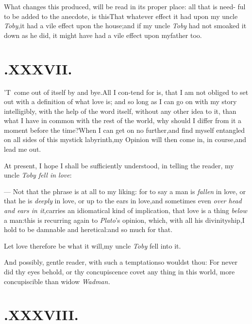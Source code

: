 \documentclass{article}
\begin{document}
What changes this produced, will be read in its proper place:
all that is need- ful to be added to the anecdote, is
this\break\tsh That whatever effect it had upon my uncle
\textit{Toby},\tsh it had a vile effect upon the
house;\tsh and if my uncle \textit{Toby} had not smoaked it
down as he did, it might have had a vile effect upon my\break father
too.

\medskip

\section{.\enspace XXXVII.}

\lettrine{\Tsk ’T}{\,} come out of itself\break
by and bye.\tsk All I con-\break tend for is, that I am
not obliged to set out with a definition of what love is; and so
long as I can go on with my story intelligibly, with the help of
the word itself, without any other idea to it, than what I have in
common with the rest of the world, why should I differ from it
a moment before the time?\tsh When I
can get
on no further,\tsk and find myself entangled on all sides of this
mystick labyrinth,\tsk my Opinion will then come in, in
course,\tsk and lead me out.

At present, I hope I shall be sufficiently understood, in
telling the reader, my uncle \textit{Toby fell in love}:

— Not that the phrase is at all to my liking: for to say a
man is \textit{fallen} in love,\break
\tsk or that he is \textit{deeply} in love,
\tsk or up to the ears in love,\tsk and sometimes even
\textit{over head and ears in it},\tsk carries an idiomatical kind
of implication, that love is a thing \textit{below} a man:\tsk this
is recurring again to \textit{Plato}’s opinion, which, with all
his divinityship,\tsk I hold to be damnable and
heretical:\tsk and so much for that.

Let love therefore be what it will,\tsk my uncle \textit{Toby}
fell into it.

\tsh And possibly, gentle reader, with such a
temptation\tsk so wouldst thou: For never did thy eyes behold, or
thy concupiscence covet any thing in this world, more concupiscible than widow
\textit{Wadman.}

\section{.\enspace XXXVIII.}
\end{document}
